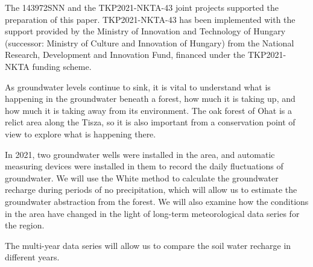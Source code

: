 The 143972SNN and the TKP2021-NKTA-43 joint projects supported the preparation of this paper. TKP2021-NKTA-43 has been implemented with the support provided by the Ministry of Innovation and Technology of Hungary (successor: Ministry of Culture and Innovation of Hungary) from the National Research, Development and Innovation Fund, financed under the TKP2021-NKTA funding scheme.
\newpage{}
{}
\begin{flushleft}





\end{flushleft}

\noindent

As groundwater levels continue to sink, it is vital to understand what is happening in the groundwater beneath a forest, how much it is taking up, and how much it is taking away from its environment. The oak forest of Ohat is a relict area along the Tisza, so it is also important from a conservation point of view to explore what is happening there.

In 2021, two groundwater wells were installed in the area, and automatic measuring devices were installed in them to record the daily fluctuations of groundwater. We will use the White method to calculate the groundwater recharge during periods of no precipitation, which will allow us to estimate the groundwater abstraction from the forest. We will also examine how the conditions in the area have changed in the light of long-term meteorological data series for the region.

The multi-year data series will allow us to compare the soil water recharge in different years.

